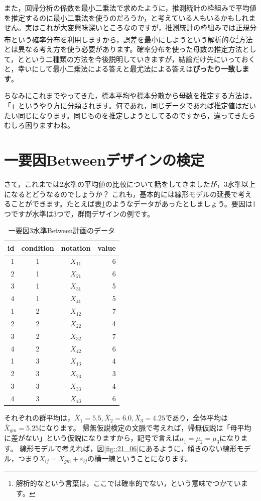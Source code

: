 \documentclass{ltjbook}
\begin{document}
また，回帰分析の係数を最小二乗法で求めたように，推測統計の枠組みで平均値を推定するのに最小二乗法を使うのだろうか，と考えている人もいるかもしれません。実はこれが大変興味深いところなのですが，推測統計の枠組みでは正規分布という確率分布を利用しますから，誤差を最小にしようという解析的な\footnote{解析的なという言葉は，ここでは確率的でない，という意味でつかています。}方法とは異なる考え方を使う必要があります。確率分布を使った母数の推定方法として，とという二種類の方法を今後説明していきますが，結論だけ先にいっておくと，幸いにして最小二乗法による答えと最尤法による答えは\textbf{ぴったり一致します}。

ちなみにこれまでやってきた，標本平均や標本分散から母数を推定する方法は，「」というやり方に分類されます。何であれ，同じデータであれば推定値はだいたい同じになります。同じものを推定しようとしてるのですから，違ってきたらむしろ困りますわね。

\section{一要因Betweenデザインの検定}
さて，これまでは2水準の平均値の比較について話をしてきましたが，3水準以上になるとどうなるのでしょうか？
これも，基本的には線形モデルの延長で考えることができます。たとえば表\ref{table::21_02}のようなデータがあったとしましょう。要因は1つですが水準は3つで，群間デザインの例です。
\begin{table}[ht]
	\centering
	\caption{一要因3水準Between計画のデータ}
	\begin{tabular}{rccr}
		\hline
		id & condition & notation & value \\
		\hline
		1  & 1         & $X_{11}$ & 6     \\
		2  & 1         & $X_{21}$ & 6     \\
		3  & 1         & $X_{31}$ & 5     \\
		4  & 1         & $X_{41}$ & 5     \\
		1  & 2         & $X_{12}$ & 7     \\
		2  & 2         & $X_{22}$ & 4     \\
		3  & 2         & $X_{32}$ & 7     \\
		4  & 2         & $X_{42}$ & 6     \\
		1  & 3         & $X_{13}$ & 4     \\
		2  & 3         & $X_{23}$ & 3     \\
		3  & 3         & $X_{33}$ & 4     \\
		4  & 3         & $X_{43}$ & 6     \\
		\hline
	\end{tabular}
	\label{table::21_02}
\end{table}
それぞれの群平均は，$\bar{X}_1 = 5.5,\bar{X}_2 = 6.0,\bar{X}_3 = 4.25$であり，全体平均は$\bar{X}_{gm}= 5.25$になります。
帰無仮説検定の文脈で考えれば，帰無仮説は「母平均に差がない」という仮説になりますから，記号で言えば$\mu_1 = \mu_2 = \mu_3$になります。
線形モデルで考えれば，図\ref{fig::21_06}にあるように，傾きのない線形モデル，つまり$X_{ij} = \bar{X}_{gm} + \varepsilon_{ij}$の横一線ということになります。
\end{document}

